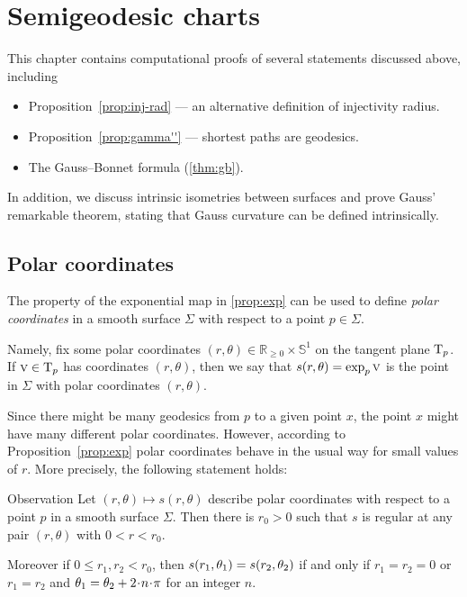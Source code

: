 \chapter{Semigeodesic charts}
\label{chap:semigeodesic}

This chapter contains computational proofs of several statements discussed above, including 
\begin{itemize}
\item Proposition~\ref{prop:inj-rad} --- an alternative definition of injectivity radius.
\item Proposition~\ref{prop:gamma''} --- shortest paths are geodesics.
\item The Gauss--Bonnet formula (\ref{thm:gb}).
\end{itemize}
In addition, we discuss intrinsic isometries between surfaces and prove Gauss' remarkable theorem, stating that Gauss curvature can be defined intrinsically.

\section{Polar coordinates}

The property of the exponential map in \ref{prop:exp} can be used to define \emph{polar coordinates} in a smooth surface $\Sigma$ with respect to a point $p\in \Sigma$.

Namely, fix some polar coordinates $(r,\theta) \in \mathbb{R}_{\ge0} \times \mathbb{S}^1  $ on the tangent plane $\mathrm{T}_p$.
If $\text{\sc{v}}\in \mathrm{T}_p$ has coordinates $(r,\theta)$,
then we say that $s(r,\theta)\z=\exp_p\vec v$ is the point in $\Sigma$ with  polar coordinates $(r,\theta)$.


Since there might be many geodesics from $p$ to a given point $x$,
the point $x$ might have many different polar coordinates.
However, according to Proposition~\ref{prop:exp} polar coordinates behave in  the usual way for small values of $r$.
More precisely, the following statement holds:

\begin{thm}{Observation}\label{obs:polar}
Let $(r,\theta)\mapsto s(r,\theta)$ describe polar coordinates with respect to a point $p$ in a  smooth surface $\Sigma$.
Then there is $r_0>0$ such that $s$ is  regular at any pair $(r,\theta)$ with $0<r<r_0$.

Moreover if $0\le r_1,r_2<r_0$, then $s(r_1,\theta_1) \z= s(r_2,\theta_2)$ if and only if
$r_1=r_2=0$ or $r_1=r_2$ and $\theta_1\z=\theta_2+2\cdot n\cdot\pi$ for an integer $n$.
\end{thm}

